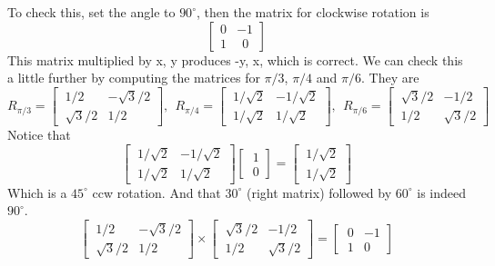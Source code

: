 \documentclass[11pt, oneside]{article}   	%
\begin{document}
To check this, set the angle to $90^\circ$, then the matrix for clockwise rotation is
\[
\begin{bmatrix}   0 & -1  \\  1 &\ \  0  \end{bmatrix}
\]
This matrix multiplied by x, y produces -y, x, which is correct.
We can check this a little further by computing the matrices for $\pi/3$, $\pi/4$ and $\pi/6$.  They are
\[ R_{\pi/3} =
\begin{bmatrix}   
\ 1/2 & -\sqrt{3}/2  \\  
\ \sqrt{3}/2 & 1/2
\end{bmatrix}, \ \ 
 R_{\pi/4} =
\begin{bmatrix}   
\ 1/\sqrt{2} & -1/\sqrt{2}  \\  
\ 1/\sqrt{2} & 1/\sqrt{2}
\end{bmatrix},  \ \
 R_{\pi/6} =
\begin{bmatrix}   
\ \sqrt{3}/2 & -1/2  \\  
\ 1/2 & \sqrt{3}/2
\end{bmatrix}
\]
Notice that 
\[
\begin{bmatrix}   
\ 1/\sqrt{2} & -1/\sqrt{2}  \\  
\ 1/\sqrt{2} & 1/\sqrt{2}
\end{bmatrix}
\begin{bmatrix}   
\ 1  \\  
\ 0
\end{bmatrix}
=
\begin{bmatrix}   
\ 1/\sqrt{2}  \\  
\ 1/\sqrt{2}
\end{bmatrix}
\]
Which is a $45^\circ$ ccw rotation.
And that $30^\circ$ (right matrix) followed by $60^\circ$ is indeed $90^\circ$.
\[
\begin{bmatrix}   
\ 1/2 & -\sqrt{3}/2  \\  
\ \sqrt{3}/2 & 1/2
\end{bmatrix}
\times
\begin{bmatrix}   
\ \sqrt{3}/2 & -1/2  \\  
\ 1/2 & \sqrt{3}/2
\end{bmatrix}
=
\begin{bmatrix}   
\ 0 & -1  \\  
\ 1 & 0
\end{bmatrix}
\]
\end{document}
